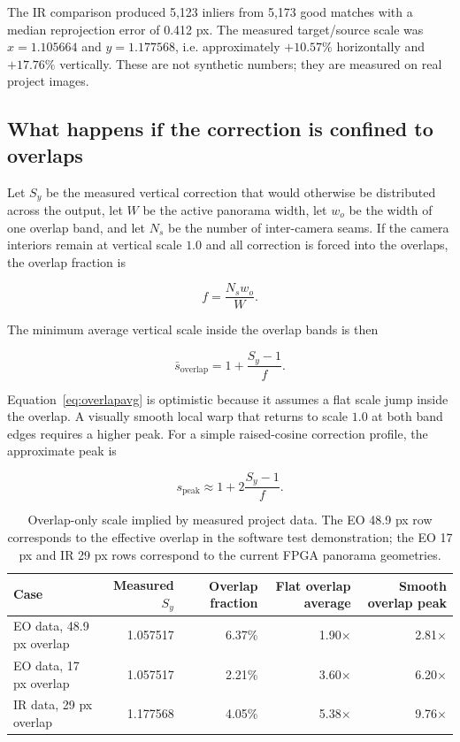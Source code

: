 \documentclass[10pt]{article}
\begin{document}
The IR comparison produced 5,123 inliers from 5,173 good matches with a median reprojection error of 0.412 px. The measured target/source scale was $x=1.105664$ and $y=1.177568$, i.e. approximately $+10.57\%$ horizontally and $+17.76\%$ vertically. These are not synthetic numbers; they are measured on real project images.

\subsection{What happens if the correction is confined to overlaps}

Let $S_y$ be the measured vertical correction that would otherwise be distributed across the output, let $W$ be the active panorama width, let $w_o$ be the width of one overlap band, and let $N_s$ be the number of inter-camera seams. If the camera interiors remain at vertical scale $1.0$ and all correction is forced into the overlaps, the overlap fraction is

\begin{equation}
f=\frac{N_s w_o}{W}.
\end{equation}

The minimum average vertical scale inside the overlap bands is then

\begin{equation}
\bar{s}_{\mathrm{overlap}}
=
1+\frac{S_y-1}{f}.
\label{eq:overlapavg}
\end{equation}

Equation~\eqref{eq:overlapavg} is optimistic because it assumes a flat scale jump inside the overlap. A visually smooth local warp that returns to scale $1.0$ at both band edges requires a higher peak. For a simple raised-cosine correction profile, the approximate peak is

\begin{equation}
s_{\mathrm{peak}}
\approx
1+2\frac{S_y-1}{f}.
\label{eq:overlappeak}
\end{equation}

\begin{table}[H]
\centering
\caption{Overlap-only scale implied by measured project data. The EO 48.9 px row corresponds to the effective overlap in the software test demonstration; the EO 17 px and IR 29 px rows correspond to the current FPGA panorama geometries.}
\label{tab:overlap-only}
\small
\begin{tabular}{@{}lrrrr@{}}
\toprule
Case & Measured $S_y$ & Overlap fraction & Flat overlap average & Smooth overlap peak \\
\midrule
EO data, 48.9 px overlap & 1.057517 & 6.37\% & 1.90$\times$ & 2.81$\times$ \\
EO data, 17 px overlap & 1.057517 & 2.21\% & 3.60$\times$ & 6.20$\times$ \\
IR data, 29 px overlap & 1.177568 & 4.05\% & 5.38$\times$ & 9.76$\times$ \\
\bottomrule
\end{tabular}
\end{table}
\end{document}
